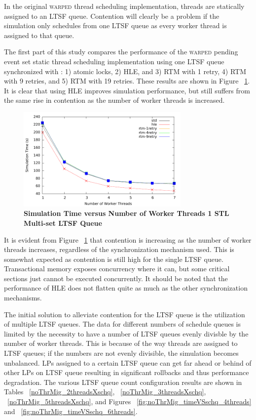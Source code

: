 \documentclass[11pt]{book}
\begin{document}
In the original \textsc{warped} thread scheduling implementation, threads are
statically assigned to an LTSF queue.  Contention will clearly be a problem if
the simulation only schedules from one LTSF queue as every worker thread is
assigned to that queue.

The first part of this study compares the performance of the \textsc{warped}
pending event set static thread scheduling implementation using one LTSF queue
synchronized with : 1) atomic locks, 2) HLE, and 3) RTM with 1 retry, 4) RTM
with 9 retries, and 5) RTM with 19 retries.  These results are shown in Figure
~\ref{fig:noThrMig_timeVSthreads_1schq}.  It is clear that using HLE improves
simulation performance, but still suffers from the same rise in contention as
the number of worker threads is increased.

\begin{figure}[H]
    \centering
    \graphicspath{ {./figures/} }
    \includegraphics[width=0.75\textwidth,keepaspectratio]{noThrMig-hugeEpidemicSim-timeVSthreads-multiset-1schQ}
    \caption{\textbf{Simulation Time versus Number of Worker Threads 1 STL Multi-set LTSF Queue}}
    \label{fig:noThrMig_timeVSthreads_1schq}
\end{figure}

It is evident from Figure ~\ref{fig:noThrMig_timeVSthreads_1schq} that
contention is increasing as the number of worker threads increases, regardless
of the synchronization mechanism used.  This is somewhat expected as contention
is still high for the single LTSF queue.  Transactional memory exposes
concurrency where it can, but some critical sections just cannot be executed
concurrently.  It should be noted that the performance of HLE does not flatten
quite as much as the other synchronization mechanisms.

The initial solution to alleviate contention for the LTSF queue is the
utilization of multiple LTSF queues.  The data for different numbers of schedule
queues is limited by the necessity to have a number of LTSF queues evenly
divisble by the number of worker threads.  This is because of the way threads
are assigned to LTSF queues; if the numbers are not evenly divisible, the
simulation becomes unbalanced.  LPs assigned to a certain LTSF queue can get far
ahead or behind of other LPs on LTSF queue resulting in significant rollbacks
and thus performance degradation.  The various LTSF queue count configuration
results are shown in Tables ~\ref{noThrMig_2threadsXschq},
~\ref{noThrMig_3threadsXschq}, ~\ref{noThrMig_5threadsXschq}, and Figures
~\ref{fig:noThrMig_timeVSschq_4threads} and
~\ref{fig:noThrMig_timeVSschq_6threads}.
\end{document}
